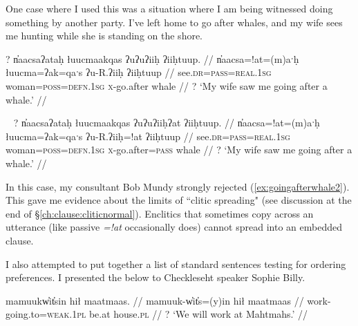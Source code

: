 One case where I used this was a situation where I am being witnessed doing something by another party. I've left home to go after whales, and my wife sees me hunting while she is standing on the shore.

\ex \label{ex:goingafterwhale1}
\begingl
\glpreamble ? n̓aacsaʔataḥ łuucmaakqas ʔuʔuʔiiḥ ʔiiḥtuup. //
\gla n̓aacsa=!at=(m)aˑḥ łuucma=ʔak=qaˑs ʔu-R.ʔiiḥ ʔiiḥtuup //
\glb see.\textsc{dr}=\textsc{pass}=\textsc{real.1sg} woman=\textsc{poss}=\textsc{defn.1sg} \textsc{x}-go.after whale //
\glft ? `My wife saw me going after a whale.' //
\endgl
\xe

\ex~ \label{ex:goingafterwhale2}
\begingl
\glpreamble ? n̓aacsaʔataḥ łuucmaakqas ʔuʔuʔiiḥʔat ʔiiḥtuup. //
\gla n̓aacsa=!at=(m)aˑḥ łuucma=ʔak=qaˑs ʔu-R.ʔiiḥ=!at ʔiiḥtuup //
\glb see.\textsc{dr}=\textsc{pass}=\textsc{real.1sg} woman=\textsc{poss}=\textsc{defn.1sg} \textsc{x}-go.after=\textsc{pass} whale //
\glft ? `My wife saw me going after a whale.' //
\endgl
\xe


\begin{comment}
\ex \label{becauseofbaby1}
\begingl
\glpreamble ? ʔuusaaḥimta nay̓aqakʔi wikitaḥ ƛuł weʔič. //
\gla ʔuusaaḥi=(m)it=maˑ nay̓aqak=ʔiˑ wik=(m)it=(m)aˑḥ ƛuł weʔič //
\glb because.of=\textsc{pst}=\textsc{real.3} baby=\textsc{art} \textsc{neg}=\textsc{pst}=\textsc{real.1sg} good sleep //
\glft ? `I didn't sleep well because of the baby.' //
\endgl
\xe

\ex~ \label{becauseofbaby2}
\begingl
\glpreamble ? ʔuusaaḥiqḥita nay̓aqakʔi wikitaḥ ƛuł weʔič. //
\gla ʔuusaaḥi-(q)ḥ=(m)it=maˑ nay̓aqak=ʔiˑ wik=(m)it=(m)aˑḥ ƛuł weʔič //
\glb because.of-\textsc{link}=\textsc{pst}=\textsc{real.3} baby=\textsc{art} \textsc{neg}=\textsc{pst}=\textsc{real.1sg} good sleep //
\glft ? `I didn't sleep well because of the baby.' //
\endgl
\xe
\end{comment}

In this case, my consultant Bob Mundy strongly rejected (\ref{ex:goingafterwhale2}). This gave me evidence about the limits of ``clitic spreading" (see discussion at the end of \S\ref{ch:clause:cliticnormal}). Enclitics that sometimes copy across an utterance (like passive \textit{=!at} occasionally does) cannot spread into an embedded clause.

I also attempted to put together a list of standard sentences testing for ordering preferences. I presented the below to Checkleseht speaker Sophie Billy.

\ex \label{ex:workatmaatmaas1}
\begingl
\glpreamble mamuukw̓it̓sin hił maatmaas. //
\gla mamuuk-w̓it̓s=(y)in hił maatmaas //
\glb work-going.to=\textsc{weak.1pl} be.at house.\textsc{pl} //
\glft ? `We will work at Mahtmahs.' //
\endgl
\xe

